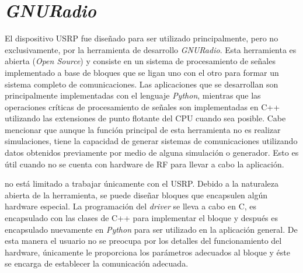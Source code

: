 
\section{\emph{GNURadio}}
\label{sec:gnuradio}

El dispositivo USRP fue dise\~nado para ser utilizado principalmente, pero no
exclusivamente, por la herramienta de desarrollo \emph{GNURadio}. Esta
herramienta es abierta (\emph{Open Source}) y consiste en un sistema de
procesamiento de se\~nales implementado a base de bloques que se ligan uno con
el otro para formar un sistema completo de comunicaciones. Las aplicaciones que
se desarrollan son principalmente implementadas con el lenguaje \emph{Python}, mientras
que las operaciones cr\'iticas de procesamiento de se\~nales son implementadas
en C++ utilizando las extensiones de punto flotante del CPU cuando sea posible. Cabe mencionar que aunque la funci\'on principal
de esta herramienta no es realizar simulaciones, tiene la capacidad de generar sistemas de
comunicaciones utilizando datos obtenidos previamente por medio de alguna
simulaci\'on o generador. Esto es \'util cuando no se cuenta con hardware de RF
para llevar a cabo la aplicaci\'on.

\gnuradio no est\'a limitado a trabajar \'unicamente con el USRP. Debido a
la naturaleza abierta de la herramienta, se puede dise\~nar bloques
que encapsulen alg\'un hardware especial. La programaci\'on del \emph{driver} se lleva a
cabo en C, es encapsulado con las clases de C++ para implementar el bloque y
despu\'es es encapsulado nuevamente en \emph{Python} para ser utilizado en la
aplicaci\'on general. De esta manera el usuario no se preocupa por los detalles
del funcionamiento del hardware, \'unicamente le proporciona los par\'ametros
adecuados al bloque y \'este se encarga de establecer la comunicaci\'on adecuada.

